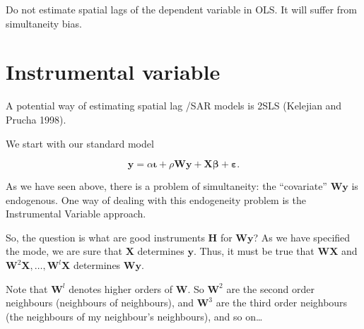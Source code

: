 \documentclass[
  letterpaper,
  DIV=11,
  numbers=noendperiod]{scrreprt}
\begin{document}
\begin{tcolorbox}[enhanced jigsaw, opacitybacktitle=0.6, left=2mm, leftrule=.75mm, toptitle=1mm, breakable, colback=white, bottomrule=.15mm, colframe=quarto-callout-warning-color-frame, colbacktitle=quarto-callout-warning-color!10!white, coltitle=black, bottomtitle=1mm, titlerule=0mm, title=\textcolor{quarto-callout-warning-color}{\faExclamationTriangle}\hspace{0.5em}{Warning}, opacityback=0, arc=.35mm, rightrule=.15mm, toprule=.15mm]

Do not estimate spatial lags of the dependent variable in OLS. It will
suffer from simultaneity bias.

\end{tcolorbox}

\hypertarget{instrumental-variable}{%
\section{Instrumental variable}\label{instrumental-variable}}

A potential way of estimating spatial lag /SAR models is 2SLS (Kelejian
and Prucha 1998).

We start with our standard model

\[
        {\boldsymbol{\mathbf{y}}}=\alpha{\boldsymbol{\mathbf{\iota}}}+\rho{\boldsymbol{\mathbf{W}}}{\boldsymbol{\mathbf{y}}}+{\boldsymbol{\mathbf{X}}}{\boldsymbol{\mathbf{\beta}}}+ {\boldsymbol{\mathbf{\varepsilon}}}. 
\]

As we have seen above, there is a problem of simultaneity: the
``covariate'' \({\boldsymbol{\mathbf{W}}}{\boldsymbol{\mathbf{y}}}\) is
endogenous. One way of dealing with this endogeneity problem is the
Instrumental Variable approach.

So, the question is what are good instruments
\(\boldsymbol{\mathbf{H}}\) for
\({\boldsymbol{\mathbf{W}}}{\boldsymbol{\mathbf{y}}}\)? As we have
specified the mode, we are sure that \({\boldsymbol{\mathbf{X}}}\)
determines \({\boldsymbol{\mathbf{y}}}\). Thus, it must be true that
\({\boldsymbol{\mathbf{W}}}{\boldsymbol{\mathbf{X}}}\) and
\({\boldsymbol{\mathbf{W}}}^2{\boldsymbol{\mathbf{X}}},\ldots, {\boldsymbol{\mathbf{W}}}^l{\boldsymbol{\mathbf{X}}}\)
determines \({\boldsymbol{\mathbf{W}}}{\boldsymbol{\mathbf{y}}}\).

Note that \({\boldsymbol{\mathbf{W}}}^l\) denotes higher orders of
\({\boldsymbol{\mathbf{W}}}\). So \({\boldsymbol{\mathbf{W}}}^2\) are
the second order neighbours (neighbours of neighbours), and
\({\boldsymbol{\mathbf{W}}}^3\) are the third order neighbours (the
neighbours of my neighbour's neighbours), and so on\ldots{}
\end{document}
